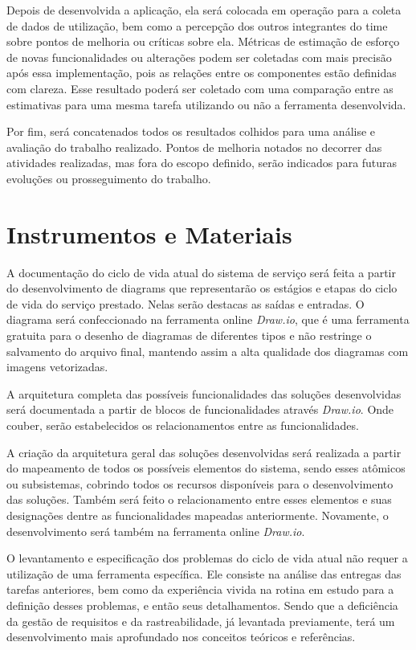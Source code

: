 Depois de desenvolvida a aplicação, ela será colocada em operação para a coleta 
de dados de utilização, bem como a percepção dos outros integrantes do time sobre 
pontos de melhoria ou críticas sobre ela. Métricas de estimação de esforço de novas 
funcionalidades ou alterações podem ser coletadas com mais precisão após essa 
implementação, pois as relações entre os componentes estão definidas com 
clareza. Esse resultado poderá ser coletado com uma comparação entre as 
estimativas para uma mesma tarefa utilizando ou não a ferramenta desenvolvida. 

Por fim, será concatenados todos os resultados colhidos para uma análise e 
avaliação do trabalho realizado. Pontos de melhoria notados no decorrer das 
atividades realizadas, mas fora do escopo definido, serão indicados para futuras 
evoluções ou prosseguimento do trabalho. 

	\section{Instrumentos e Materiais}

	A documentação do ciclo de vida atual do sistema de serviço será feita a partir do desenvolvimento de diagrams que representarão os estágios e etapas do ciclo de vida do serviço prestado. Nelas serão destacas as saídas e entradas. O diagrama será confeccionado na ferramenta online \textit{Draw.io}, 
	que é uma ferramenta gratuita para o desenho de diagramas de diferentes 
	tipos e não restringe o salvamento do arquivo final, mantendo 
	assim a alta qualidade dos diagramas com imagens vetorizadas. 
	
	A arquitetura completa das possíveis funcionalidades das soluções desenvolvidas será documentada a partir de blocos de funcionalidades através \textit{Draw.io}. Onde couber, serão estabelecidos os relacionamentos entre as funcionalidades.

	A criação da arquitetura geral das soluções desenvolvidas será realizada a partir do mapeamento de todos os possíveis elementos do sistema, sendo esses atômicos ou 
	subsistemas, cobrindo todos os recursos disponíveis para o 
	desenvolvimento das soluções. Também será feito o relacionamento entre 
	esses elementos e suas designações dentre as funcionalidades mapeadas 
	anteriormente. Novamente, o desenvolvimento será também na ferramenta 
	online \textit{Draw.io}.

	O levantamento e especificação dos problemas do ciclo de vida atual não requer a utilização de uma ferramenta específica. Ele consiste na análise das entregas das tarefas anteriores, bem como da experiência vivida na rotina em estudo para a definição desses problemas, e então seus detalhamentos. Sendo que a deficiência da gestão de requisitos e da rastreabilidade, já levantada previamente, terá um desenvolvimento mais aprofundado nos conceitos teóricos e referências.

